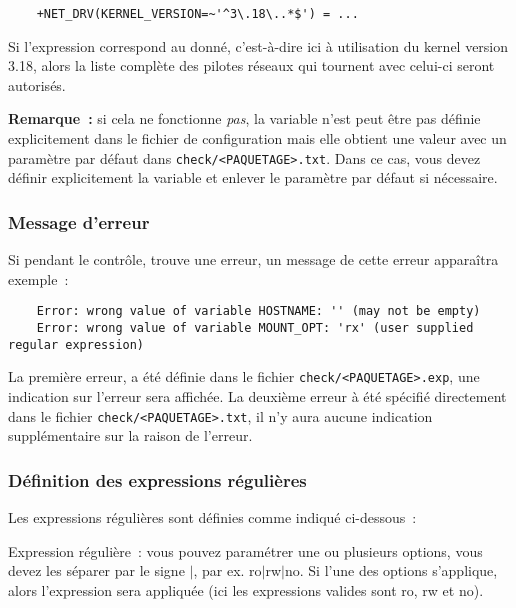 \begin{example}
\begin{verbatim}
    +NET_DRV(KERNEL_VERSION=~'^3\.18\..*$') = ...
\end{verbatim}
\end{example}

Si l'expression  correspond au donné, c'est-à-dire ici à
utilisation du kernel version 3.18, alors la liste complète des pilotes réseaux
qui tournent avec celui-ci seront autorisés.

\textbf{Remarque~:} si cela ne fonctionne \emph{pas}, la variable n'est peut être pas définie
explicitement dans le fichier de configuration mais elle obtient une valeur avec un paramètre
par défaut dans \texttt{check/<PAQUETAGE>.txt}. Dans ce cas, vous devez définir explicitement
la variable et enlever le paramètre par défaut si nécessaire.


\subsubsection{Message d'erreur}

Si pendant le contrôle,  trouve une erreur, un message de cette erreur
apparaîtra exemple~:

\begin{example}
\begin{verbatim}
    Error: wrong value of variable HOSTNAME: '' (may not be empty)
    Error: wrong value of variable MOUNT_OPT: 'rx' (user supplied regular expression)
\end{verbatim}
\end{example}

La première erreur, a été définie dans le fichier \texttt{check/<PAQUETAGE>.exp},
une indication sur l'erreur sera affichée. La deuxième erreur à été spécifié
directement dans le fichier \texttt{check/<PAQUETAGE>.txt}, il n'y aura aucune indication
supplémentaire sur la raison de l'erreur.


\subsubsection{Définition des expressions régulières}

Les expressions régulières sont définies comme indiqué ci-dessous~:

Expression régulière~: vous pouvez paramétrer une ou plusieurs options, vous
devez les séparer par le signe \og{}$|$\fg{}, par ex. \og{}ro$|$rw$|$no\fg{}. Si l’une des
options s'applique, alors l'expression sera appliquée (ici les expressions
valides sont \og{}ro\fg{}, \og{}rw\fg{} et \og{}no\fg{}).

